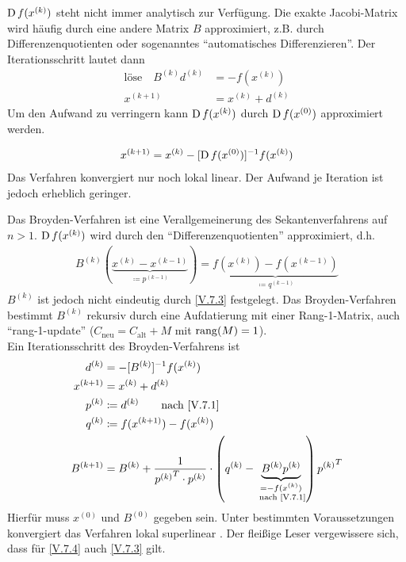 $\operatorname{D} f(x^{(k)})$ steht nicht immer analytisch zur Verfügung.
Die exakte Jacobi-Matrix wird häufig durch eine andere Matrix $B$ approximiert, 
z.B. durch Differenzenquotienten oder sogenanntes
\enquote{automatisches Differenzieren}.
Der Iterationsschritt lautet dann
\begin{align}
  \text{löse}\quad B^{(k)}d^{(k)} &= -f(x^{(k)}) 
                                    \label{V.7.1} \\\nonumber
  x^{(k+1)} &=x^{(k)} + d^{(k)}
\end{align}
Um den Aufwand zu verringern kann $\operatorname{D} f(x^{(k)})$ durch
$\operatorname{D} f(x^{(0)})$ approximiert werden.


\begin{gather}
  x^{(k+1)} = x^{(k)} -[\operatorname{D} f(x^{(0)})]^{-1} f(x^{(k)})
  \label{V.7.2}
\end{gather}
Das Verfahren konvergiert nur noch lokal linear.
Der Aufwand je Iteration ist jedoch erheblich geringer.



Das Broyden-Verfahren ist eine Verallgemeinerung des Sekantenverfahrens
auf $n>1$. $\operatorname{D} f(x^{(k)})$ wird durch den
\enquote{Differenzenquotienten} approximiert, d.h.
\begin{gather}
  B^{(k)}(\underbrace{x^{(k)}-x^{(k-1)}}_{\coloneqq p^{(k-1)}})
  = \underbrace{f(x^{(k)})-f(x^{(k-1)})}_{\coloneqq
    q^{(k-1)}}
  \label{V.7.3}
\end{gather}
$B^{(k)}$ ist jedoch nicht eindeutig durch \eqref{V.7.3} festgelegt.
Das Broyden-Verfahren bestimmt $B^{(k)}$ rekursiv durch eine 
Aufdatierung mit einer Rang-1-Matrix, auch \enquote{rang-1-update}
($C_\text{neu} = C_\text{alt} +M$ mit $\operatorname{rang}(M)=1$). \\

Ein Iterationsschritt des Broyden-Verfahrens ist 
\begin{align}\nonumber
  d^{(k)} &= -[B^{(k)}]^{-1} f(x^{(k)}) \\\nonumber
  x^{(k+1)} &= x^{(k)} + d^{(k)} \\\nonumber
  p^{(k)} & \coloneqq d^{(k)} \qquad \text{nach
            \eqref{V.7.1}}\\\nonumber
  q^{(k)} & \coloneqq f(x^{(k+1)})-f(x^{(k)}) \\
  B^{(k+1)} & = B^{(k)} + \frac{1}{{p^{(k)}}^T\cdot p^{(k)}}
              \cdot \left(q^{(k)}-
              \underbrace{B^{(k)}p^{(k)}}_{\substack{=-f(x^{(k)})\\
  \text{ nach \eqref{V.7.1}}}}
  \right){p^{(k)}}^T
  \label{V.7.4}
\end{align}
Hierfür muss $x^{(0)} $ und $B^{(0)}$ gegeben sein.
Unter bestimmten Voraussetzungen konvergiert das Verfahren lokal
superlinear \cite[siehe][dortige Referenzen]{stoerbulirsch}.
Der fleißige Leser vergewissere sich, dass für
\eqref{V.7.4} auch \eqref{V.7.3} gilt.


